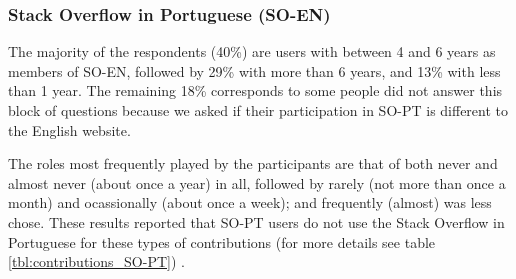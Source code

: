 \subsubsection{Stack Overflow in Portuguese (SO-EN)}
The majority of the respondents (40\%) are users with between 4 and 6 years as members of SO-EN, followed by 29\% with more than 6 years, and 13\% with less than 1 year. The remaining 18\% corresponds to some people did not answer this block of questions because we asked if their participation in SO-PT is different to the English website.

The roles most frequently played by the participants are that of both never and almost never (about once a year) in all, followed by rarely (not more than once a month) and ocassionally (about once a week); and frequently (almost) was less chose. These results reported that SO-PT users do not use the Stack Overflow in Portuguese for these types of contributions (for more details see table \ref{tbl:contributions_SO-PT}) . 



